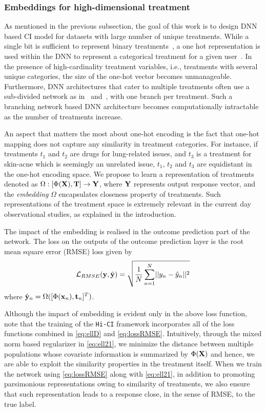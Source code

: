 \documentclass[twoside,11pt]{article}
\begin{document}
\subsubsection{Embeddings for high-dimensional treatment}
As mentioned in the previous subsection, the goal of this work is to design DNN based CI model for datasets with large number of unique treatments. While a single bit is sufficient to represent binary treatments~\citep{johansson2016learning}, a one hot representation is used within the DNN to represent a categorical treatment for a given user~\citep{esann-multiMBNN}. In the presence of high-cardinality treatment variables, i.e., treatments with several unique categories, the size of the one-hot vector becomes unmanageable. Furthermore, DNN architectures that cater to multiple treatments often use a sub-divided network as in~\citep{schwab2018perfect} and~\citep{schwab2019learning}, with one branch per treatment. Such a branching network based DNN architecture becomes computationally intractable as the number of treatments increase. 

An aspect that matters the most about one-hot encoding is the fact that one-hot mapping does not capture any similarity in treatment categories. For instance, if treatments $t_1$ and $t_2$ are drugs for lung-related issues, and $t_3$ is a treatment for skin-acne which is seemingly an unrelated issue, $t_1$, $t_2$ and $t_3$ are equidistant in the one-hot encoding space. We propose to learn a representation of treatments denoted as $\Omega: [\Phi(\mathbf{X}),\mathbf{T}] \rightarrow \mathbf{Y}$, where $\mathbf{Y}$ represents output response vector, and the \emph{embedding} $\Omega$ encapsulates closeness property of treatments. Such representations of the treatment space is extremely relevant in the current day observational studies, as explained in the introduction. 

The impact of the embedding is realised in the outcome prediction part of the network. The loss on the outputs of the outcome prediction layer is the root mean square error (RMSE) loss given by
\begin{equation}
    \mathcal{L}_{RMSE}(\mathbf{y},\hat{\mathbf{y}}) = \sqrt{\frac{1}{N}\sum_{n = 1}^N\lvert\lvert y_n - \hat{y}_n \rvert\rvert^2}
    \label{eq:lossRMSE}
\end{equation}
where $\hat{\mathbf{y}}_n = \Omega([\Phi(\mathbf{x}_n),\mathbf{t}_n]^T)$.

Although the impact of embedding is evident only in the above loss function, note that the training of the \texttt{Hi-CI} framework incorporates all of the loss functions combined in \eqref{eq:ellD} and \eqref{eq:lossRMSE}. Intuitively, through the mixed norm based regularizer in \eqref{eq:ell21}, we minimize the distance between multiple populations whose covariate information is summarized by $\Phi(\mathbf{X})$ and hence, we are able to exploit the similarity properties in the treatment itself. When we train the network using \eqref{eq:lossRMSE} along with \eqref{eq:ell21}, in addition to promoting parsimonious representations owing to similarity of treatments, we also ensure that such representation leads to a response close, in the sense of RMSE, to the true label. 
\end{document}
